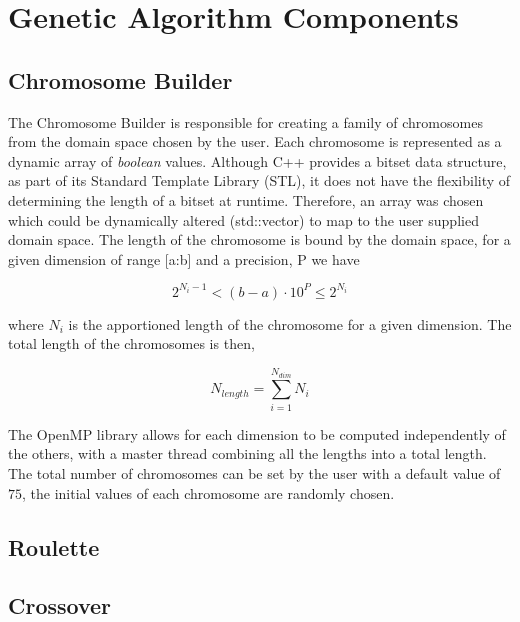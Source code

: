 \documentclass[aps,prl,preprint,groupedaddress,showkeys, nobibnotes]{revtex4-1}
\begin{document}
\subsection{}
\subsubsection{}

\section{Genetic Algorithm Components}
\subsection{Chromosome Builder}
The Chromosome Builder is responsible for creating a family of chromosomes from the domain space chosen by the user.  Each chromosome is represented as a dynamic array of \textit{boolean} values.  Although C++ provides a bitset data structure, as part of its Standard Template Library (STL), it does not have the flexibility of determining the length of a bitset at runtime.  Therefore, an array was chosen which could be dynamically altered (std::vector) to map to the user supplied domain space.  The length of the chromosome is bound by the domain space, for a given dimension of range [a:b] and a precision, P we have 

\begin{equation}
2^{N_{i}-1}<(b-a)\cdot10^{P}\leq2^{N_{i}}
\end{equation}

where $N_{i}$ is the apportioned length of the chromosome for a given dimension.  The total length of the chromosomes is then,

\begin{equation}
N_{length } = \sum\limits_{i=1}^{N_{dim}} N_{i}
\end{equation}

The OpenMP library allows for each dimension to be computed independently of the others, with a master thread combining all the lengths into a total length.  The total number of chromosomes can be set by the user with a default value of $75$, the initial values of each chromosome are randomly chosen.

\subsection{Roulette}
\subsection{Crossover}
\end{document}
